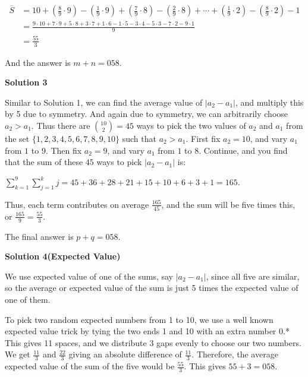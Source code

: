 \begin{enumerate}
 
 \begin{align*} \overline{S} &= 10 + \left(\frac{8}{9} \cdot 9\right) - \left(\frac{1}{9} \cdot 9\right) + \left(\frac{7}{9} \cdot 8\right) - \left(\frac 29 \cdot 8\right) + \cdots + \left(\frac{1}{9} \cdot 2\right) - \left(\frac{8}{9} \cdot 2\right) - 1 \\ &= \frac{9 \cdot 10 + 7 \cdot 9 + 5 \cdot 8 + 3 \cdot 7 + 1 \cdot 6 - 1 \cdot 5 - 3 \cdot 4 - 5 \cdot 3 - 7 \cdot 2 - 9 \cdot 1}{9} \\ &= \frac{55}{3} \end{align*}


 And the answer is $m+n = \boxed{058}$.

 



\textbf{Solution 3}

Similar to Solution 1, we can find the average value of $|a_2 - a_1|$, and multiply this by 5 due to symmetry.  And again due to symmetry, we can arbitrarily choose $a_2 > a_1$.  Thus there are $\binom{10}{2} = 45$ ways to pick the two values of $a_2$ and $a_1$ from the set $\{1, 2, 3, 4, 5, 6, 7, 8, 9, 10\}$ such that $a_2 > a_1$.  First fix $a_2 = 10$, and vary $a_1$ from $1$ to $9$.  Then fix $a_2 = 9$, and vary $a_1$ from $1$ to $8$.  Continue, and you find that the sum of these $45$ ways to pick $|a_2 - a_1|$ is:

 $\sum\limits_{k = 1}^{9}\sum\limits_{j = 1}^{k}j = 45+36+28+21+15+10+6+3+1 = 165$.  

 Thus, each term contributes on average $\frac{165}{45}$, and the sum will be five times this, or $\frac{165}{9} = \frac{55}{3}$.

 The final answer is $p+q = \boxed{058}$.

 



\textbf{Solution 4(Expected Value)}

We use expected value of one of the sums, say $|a_2 - a_1|$, since all five are similar, so the average or expected value of the sum is just 5 times the expected value of one of them.

 To pick two random expected numbers from 1 to 10, we use a well known expected value trick by tying the two ends 1 and 10 with an extra number 0.* This gives 11 spaces, and we distribute 3 gaps evenly to choose our two numbers. We get $\frac{11}{3}$ and $\frac{22}{3}$ giving an absolute difference of $\frac{11}{3}$. Therefore, the average expected value of the sum of the five would be $\frac{55}{3}$. This gives $55+3=\boxed{058}$.


\end{enumerate}
